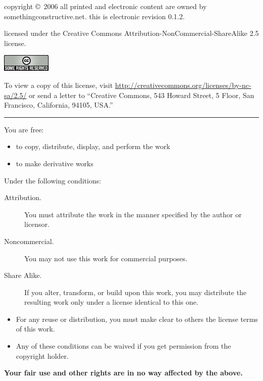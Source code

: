 \begin{center}

  copyright \copyright\ 2006 all printed and electronic content are
  owned by somethingconstructive.net.  this is electronic revision 0.1.2.

  \bigskip

  licensed under the Creative Commons
  Attribution-\-NonCommercial-\-ShareAlike 2.5 license.

  \medskip

  \includegraphics{cc.png}

  \medskip

  To view a copy of this license, visit
  \href{http://creativecommons.org/licenses/by-nc-sa/2.5/}{http://creativecommons.org/licenses/by-nc-sa/2.5/}
  or send a letter to ``Creative Commons, 543 Howard Street,
  5 Floor, San Francisco, California, 94105, USA.''

\rule{4cm}{1pt}

\end{center}

\noindent You are free:

\begin{itemize}
  \item to copy, distribute, display, and perform the work
  \item to make derivative works
\end{itemize}

\noindent Under the following conditions:

\begin{description}

  \item[Attribution.] You must attribute the work in the manner
  specified by the author or licensor.

  \item[Noncommercial.] You may not use this work for commercial purposes.

  \item[Share Alike.] If you alter, transform, or build upon this
  work, you may distribute the resulting work only under a license
  identical to this one.

\end{description}

\begin{itemize}

    \item For any reuse or distribution, you must make clear to others
    the license terms of this work.

    \item Any of these conditions can be waived if you get permission
    from the copyright holder.

\end{itemize}

\noindent\textbf{Your fair use and other rights are in no way affected
by the above.}

\clearpage
